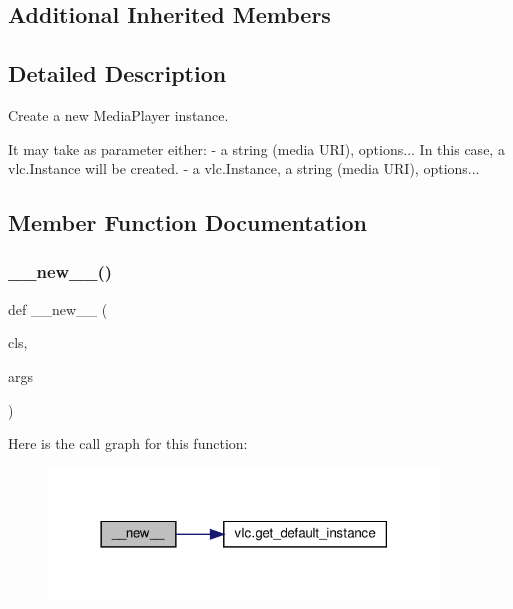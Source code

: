\subsection*{Additional Inherited Members}


\subsection{Detailed Description}
\begin{DoxyVerb}Create a new MediaPlayer instance.

It may take as parameter either:
  - a string (media URI), options... In this case, a vlc.Instance will be created.
  - a vlc.Instance, a string (media URI), options...\end{DoxyVerb}
 

\subsection{Member Function Documentation}
\mbox{\label{classvlc_1_1_media_player_acc2aa3fac6a63e8bac4f19efc327102b}} 
\subsubsection{\texorpdfstring{\+\_\+\+\_\+new\+\_\+\+\_\+()}{\_\_new\_\_()}}
{\footnotesize\ttfamily def \+\_\+\+\_\+new\+\_\+\+\_\+ (\begin{DoxyParamCaption}\item[{}]{cls,  }\item[{}]{args }\end{DoxyParamCaption})}

Here is the call graph for this function\+:
\nopagebreak
\begin{figure}[H]
\begin{center}
\leavevmode
\includegraphics[width=294pt]{classvlc_1_1_media_player_acc2aa3fac6a63e8bac4f19efc327102b_cgraph}
\end{center}
\end{figure}
\mbox{\label{classvlc_1_1_media_player_a19d8a1e64748a83dced6420ae1d98de8}} 
